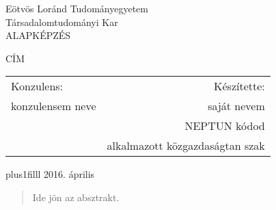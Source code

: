\documentclass[12pt,a4paper]{report}
\begin{document}
\thispagestyle{empty}

\begin{center}
\LARGE
Eötvös Loránd Tudományegyetem \\
Társadalomtudományi Kar \\
ALAPKÉPZÉS

\vspace{60mm}

\Huge{CÍM}
\LARGE
\vspace{60mm}

\begin{tabular*}{\linewidth}{@{\extracolsep{\fill}}lr}
  Konzulens: & Készítette: \\
  konzulensem neve & saját nevem \\    
   & NEPTUN kódod \\
   & alkalmazott közgazdaságtan szak
\end{tabular*}
\vskip0pt plus1filll
2016. április
\end{center}


\newpage
\setcounter{page}{1} 

\begin{abstract}

Ide jön az absztrakt.

\end{abstract}

\tableofcontents
\listoftables
\listoffigures
{}

\end{document}
